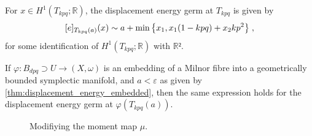 \documentclass[12pt,a4paper,draft]{scrartcl}
\begin{document}
\begin{theorem}
  \label{thm:main}

  For $x ∈ H^1(T_{kpq}; ℝ)$, the displacement energy germ at $T_{kpq}$ is given by
  \[ [e]_{T_{kpq}(a)} (x) \sim a + \min\qty{x_1, x_1 (1-kpq) + x_2 k p^2} \; , \]
  for some identification of $H^1(T_{kpq};ℝ)$ with $ℝ²$.

  If $φ \colon B_{dpq} ⊃ U → (X,ω)$ is an embedding of a Milnor fibre into a geometrically bounded symplectic manifold, and $a<ε$ as given by \cref{thm:displacement_energy_embedded}, then the same expression holds for the displacement energy germ at $φ(T_{kpq}(a))$.
\end{theorem}

\begin{figure}
  \centering
  \caption{Modifiying the moment map $μ$.}
  \label{fig:mod_moment_map}
\end{figure}
\end{document}

